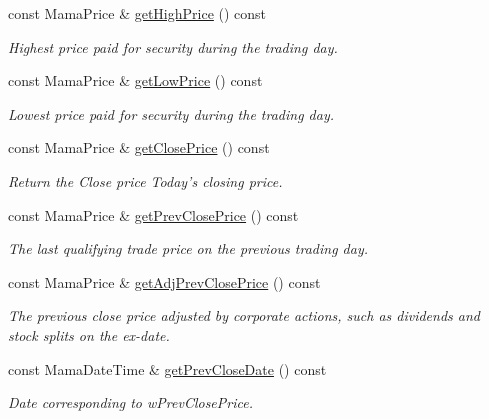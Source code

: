 \begin{CompactItemize}
const Mama\-Price \& \hyperlink{classWombat_1_1MamdaTradeListener_caff6510c7f5bce0b6d4065c5ae8df53}{get\-High\-Price} () const 
\begin{CompactList}\small\item\em Highest price paid for security during the trading day. \item\end{CompactList}\item 
const Mama\-Price \& \hyperlink{classWombat_1_1MamdaTradeListener_3358318d745bd8ae681eceba0c7df077}{get\-Low\-Price} () const 
\begin{CompactList}\small\item\em Lowest price paid for security during the trading day. \item\end{CompactList}\item 
const Mama\-Price \& \hyperlink{classWombat_1_1MamdaTradeListener_cdd9837ec44cbdfb5bd15b563d99ba7b}{get\-Close\-Price} () const 
\begin{CompactList}\small\item\em Return the Close price Today's closing price. \item\end{CompactList}\item 
const Mama\-Price \& \hyperlink{classWombat_1_1MamdaTradeListener_7cef846e6625cd78c1c05cd25ea8ee09}{get\-Prev\-Close\-Price} () const 
\begin{CompactList}\small\item\em The last qualifying trade price on the previous trading day. \item\end{CompactList}\item 
const Mama\-Price \& \hyperlink{classWombat_1_1MamdaTradeListener_e8de0253e81ad8f4e22380854e0a1750}{get\-Adj\-Prev\-Close\-Price} () const 
\begin{CompactList}\small\item\em The previous close price adjusted by corporate actions, such as dividends and stock splits on the ex-date. \item\end{CompactList}\item 
const Mama\-Date\-Time \& \hyperlink{classWombat_1_1MamdaTradeListener_ce42d352a2c3d93d2f7fd2d9131559e9}{get\-Prev\-Close\-Date} () const 
\begin{CompactList}\small\item\em Date corresponding to w\-Prev\-Close\-Price. \item\end{CompactList}\item 

\end{CompactItemize}
